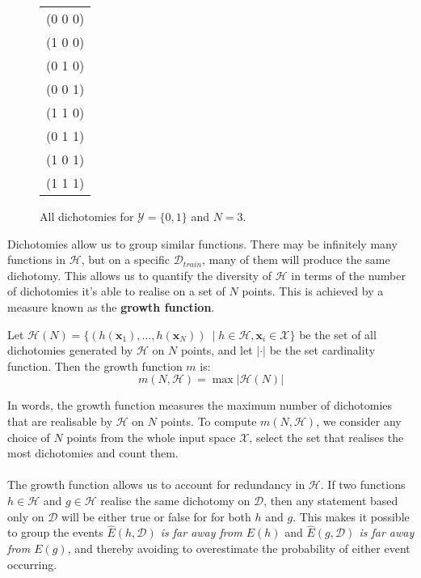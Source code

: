 \begin{figure}[h]
	\begin{center}
			\begin{tabular}{c}
		(0 0 0) \\
		(1 0 0) \\
		(0 1 0) \\
		(0 0 1) \\
		(1 1 0) \\
		(0 1 1) \\
		(1 0 1) \\
		(1 1 1) \\
	\end{tabular}
	\end{center}
	\label{dichotomies}
	\caption{All dichotomies for $\mathcal{Y} = \{0, 1\}$ and $N = 3$.}
\end{figure}

Dichotomies allow us to group similar functions. There may be infinitely many functions in $\mathcal{H}$, but on a specific $\mathcal{D}_{train}$, many of them will produce the same dichotomy.
This allows us to quantify the diversity of $\mathcal{H}$ in terms of the number of dichotomies it's able to realise on a set of $N$ points. This is achieved by a measure known as the \textbf{growth function}.
\begin{definition}
	\label{growth_function}
	Let $\mathcal{H}(N) = \{(h(\mathbf{x}_1), \dots, h(\mathbf{x}_N))\ \mid h \in \mathcal{H}, \mathbf{x}_i \in \mathcal{X}\}$ be the set of all dichotomies generated by $\mathcal{H}$ on $N$ points, and let $|\cdot|$ be the set cardinality function. Then the growth function $m$ is:
	$$
		m(N, \mathcal{H}) = \max |\mathcal{H}(N)|
	$$
\end{definition}
In words, the growth function measures the maximum number of dichotomies that are realisable by $\mathcal{H}$ on $N$ points. To compute $m(N, \mathcal{H})$, we consider any choice of $N$ points from the whole input space $\mathcal{X}$, select the set that realises the most dichotomies and count them.
\\\\
The growth function allows us to account for redundancy in $\mathcal{H}$. If two functions $h \in \mathcal{H}$ and $g \in \mathcal{H}$ realise the same dichotomy on $\mathcal{D}$, then any statement based only on $\mathcal{D}$ will be either true or false for for both $h$ and $g$. This makes it possible to group the events \textit{$\hat{E}(h, \mathcal{D})$ is far away from $E(h)$} and \textit{$\hat{E}(g, \mathcal{D})$ is far away from $E(g)$}, and thereby avoiding to overestimate the probability of either event occurring.

